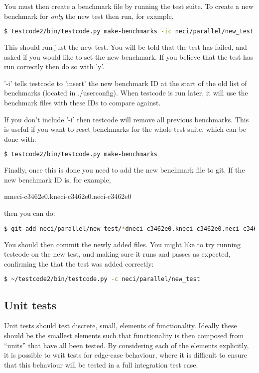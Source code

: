 \documentclass[a4paper,notitlepage,dvipsnames]{scrreprt}
\begin{document}
{{{You must then create a benchmark file by running the test suite. To create a
new benchmark for \emph{only} the new test then run, for example,

\begin{lstlisting}[language=bash]
    $ testcode2/bin/testcode.py make-benchmarks -ic neci/parallel/new_test
\end{lstlisting}

This should run just the new test. You will be told that the test has failed,
and asked if you would like to set the new benchmark. If you believe that the
test has run correctly then do so with 'y'.

'-i' tells testcode to 'insert' the new benchmark ID at the start of the old
list of benchmarks (located in ./userconfig). When testcode is run later, it
will use the benchmark files with these IDs to compare against.

If you don't include '-i' then testcode will remove all previous benchmarks.
This is useful if you want to reset benchmarks for the whole test suite, which
can be done with:

\begin{lstlisting}[language=bash]
    $ testcode2/bin/testcode.py make-benchmarks
\end{lstlisting}

Finally, once this is done you need to add the new benchmark file to git.
If the new benchmark ID is, for example,

mneci-c3462e0.kneci-c3462e0.neci-c3462e0

then you can do:

\begin{lstlisting}[language=bash]
    $ git add neci/parallel/new_test/*dneci-c3462e0.kneci-c3462e0.neci-c3462e0*
\end{lstlisting}

You should then commit the newly added files. You might like to try running
testcode on the new test, and making sure it runs and passes as expected,
confirming the that the test was added correctly:

\begin{lstlisting}[language=bash]
    $ ~/testcode2/bin/testcode.py -c neci/parallel/new_test
\end{lstlisting}

\subsection{Unit tests}
    Unit tests should test discrete, small, elements of functionality. Ideally these should be
    the smallest elements such that functionality is then composed from ``units'' that have all
    been tested. By considering each of the elements explicitly, it is possible to writ tests
    for edge-case behaviour, where it is difficult to ensure that this behaviour will be tested
    in a full integration test case.

}}}
\end{document}
